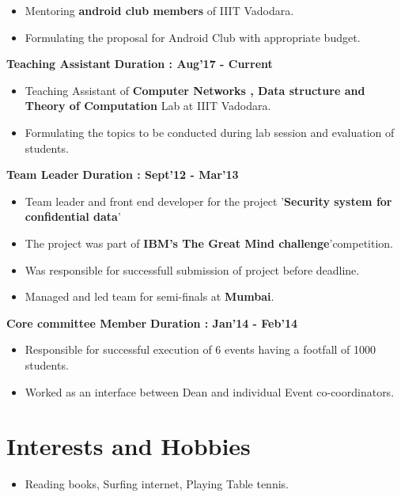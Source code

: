 \documentclass{article}
\begin{document}
\begin{itemize}[noitemsep]
	\item Mentoring \textbf{android club members} of IIIT Vadodara.
	\item Formulating the proposal for Android Club with appropriate budget.
\end{itemize}



\vspace*{.3cm}
\textbf{Teaching Assistant}\hspace{11cm}
\textbf{Duration : Aug'17 - Current} 
\begin{itemize}[noitemsep]
	
	\item Teaching Assistant of \textbf{Computer Networks , Data structure and Theory of Computation} Lab at IIIT Vadodara. 
	\item Formulating the topics to be conducted during lab session and evaluation of students.
	
\end{itemize}




\vspace*{.3cm}
 \textbf{Team Leader}\hspace{12cm}
 \textbf{Duration : Sept'12 - Mar'13 }
\begin{itemize}[noitemsep]
	\item Team leader and front end developer for the project '\textbf{Security system for confidential data}' 
	\item The project was part of \textbf{IBM's The Great Mind challenge}'competition.
	\item Was responsible for successfull submission of project before deadline.
	\item Managed and led team for semi-finals at \textbf{Mumbai}.
\end{itemize}


\vspace*{.3cm}
\textbf{Core committee Member}\hspace{9.8cm}
\textbf{Duration : Jan'14 - Feb'14}

\begin{itemize}[noitemsep] 
	\item Responsible for successful execution of 6 events having a footfall of 1000 students.
	\item Worked as an interface between Dean and individual Event co-coordinators.
\end{itemize}

\section{Interests and Hobbies}
\begin{itemize}
\item  Reading books, Surfing internet, Playing Table tennis.
\end{itemize}
\end{document}
